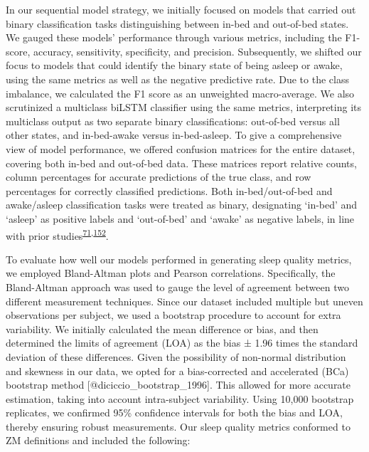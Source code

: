 \documentclass[
  10pt,
]{scrbook}
\begin{document}
In our sequential model strategy, we initially focused on models that
carried out binary classification tasks distinguishing between in-bed
and out-of-bed states. We gauged these models' performance through
various metrics, including the F1-score, accuracy, sensitivity,
specificity, and precision. Subsequently, we shifted our focus to models
that could identify the binary state of being asleep or awake, using the
same metrics as well as the negative predictive rate. Due to the class
imbalance, we calculated the F1 score as an unweighted macro-average. We
also scrutinized a multiclass biLSTM classifier using the same metrics,
interpreting its multiclass output as two separate binary
classifications: out-of-bed versus all other states, and in-bed-awake
versus in-bed-asleep. To give a comprehensive view of model performance,
we offered confusion matrices for the entire dataset, covering both
in-bed and out-of-bed data. These matrices report relative counts,
column percentages for accurate predictions of the true class, and row
percentages for correctly classified predictions. Both in-bed/out-of-bed
and awake/asleep classification tasks were treated as binary,
designating `in-bed' and `asleep' as positive labels and `out-of-bed'
and `awake' as negative labels, in line with prior
studies\textsuperscript{\protect\hyperlink{ref-hjorth_measure_2012}{71},\protect\hyperlink{ref-kushida_comparison_2001}{152}}.

To evaluate how well our models performed in generating sleep quality
metrics, we employed Bland-Altman plots and Pearson correlations.
Specifically, the Bland-Altman approach was used to gauge the level of
agreement between two different measurement techniques. Since our
dataset included multiple but uneven observations per subject, we used a
bootstrap procedure to account for extra variability. We initially
calculated the mean difference or bias, and then determined the limits
of agreement (LOA) as the bias ± 1.96 times the standard deviation of
these differences. Given the possibility of non-normal distribution and
skewness in our data, we opted for a bias-corrected and accelerated
(BCa) bootstrap method {[}@diciccio\_bootstrap\_1996{]}. This allowed
for more accurate estimation, taking into account intra-subject
variability. Using 10,000 bootstrap replicates, we confirmed 95\%
confidence intervals for both the bias and LOA, thereby ensuring robust
measurements. Our sleep quality metrics conformed to ZM definitions and
included the following:
\end{document}
